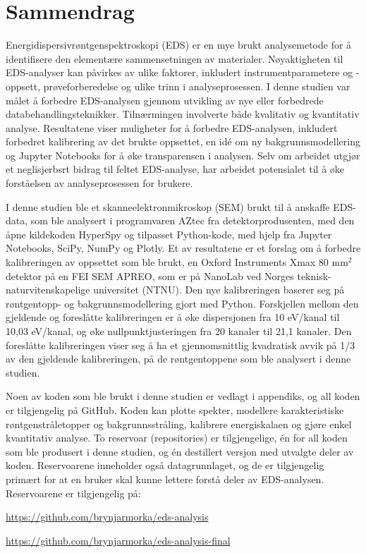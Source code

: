 \chapter*{Sammendrag}

Energidispersivrøntgenspektroskopi (EDS) er en mye brukt analysemetode for å identifisere den elementære sammensetningen av materialer.
Nøyaktigheten til EDS-analyser kan påvirkes av ulike faktorer, inkludert instrumentparametere og -oppsett, prøveforberedelse og ulike trinn i analyseprosessen.
I denne studien var målet å forbedre EDS-analysen gjennom utvikling av nye eller forbedrede databehandlingsteknikker.
Tilnærmingen involverte både kvalitativ og kvantitativ analyse.
Resultatene viser muligheter for å forbedre EDS-analysen, inkludert forbedret kalibrering av det brukte oppsettet, en idé om ny bakgrunnsmodellering og Jupyter Notebooks for å øke transparensen i analysen.
Selv om arbeidet utgjør et neglisjerbsrt bidrag til feltet EDS-analyse, har arbeidet potensialet til å øke forståelsen av analyseprosessen for brukere.



I denne studien ble et skanneelektronmikroskop (SEM) brukt til å anskaffe EDS-data, som ble analysert i programvaren AZtec fra detektorprodusenten, med den åpne kildekoden HyperSpy og tilpasset Python-kode, med hjelp fra Jupyter Notebooks, SciPy, NumPy og Plotly.
Et av resultatene er et forslag om å forbedre kalibreringen av oppsettet som ble brukt, en Oxford Instruments Xmax 80 mm$^2$ detektor på en FEI SEM APREO, som er på NanoLab ved Norges teknisk-naturvitenskapelige universitet (NTNU).
Den nye kalibreringen baserer seg på røntgentopp- og bakgrunnsmodellering gjort med Python.
Forskjellen mellom den gjeldende og foreslåtte kalibreringen er å øke dispersjonen fra 10 eV/kanal til 10,03 eV/kanal, og øke nullpunktjusteringen fra 20 kanaler til 21,1 kanaler.
Den foreslåtte kalibreringen viser seg å ha et gjennomsnittlig kvadratisk avvik på 1/3 av den gjeldende kalibreringen, på de røntgentoppene som ble analysert i denne studien.



Noen av koden som ble brukt i denne studien er vedlagt i appendiks, og all koden er tilgjengelig på GitHub.
Koden kan plotte spekter, modellere karakteristiske røntgenstråletopper og bakgrunnsstråling, kalibrere energiskalaen og gjøre enkel kvantitativ analyse.
To reservoar (repositories) er tilgjengelige, én for all koden som ble produsert i denne studien, og én destillert versjon med utvalgte deler av koden.
Reservoarene  inneholder også datagrunnlaget, og de er tilgjengelig primært for at en bruker skal kunne lettere forstå deler av EDS-analysen.
Reservoarene er tilgjengelig på:



\url{https://github.com/brynjarmorka/eds-analysis}

\url{https://github.com/brynjarmorka/eds-analysis-final}


